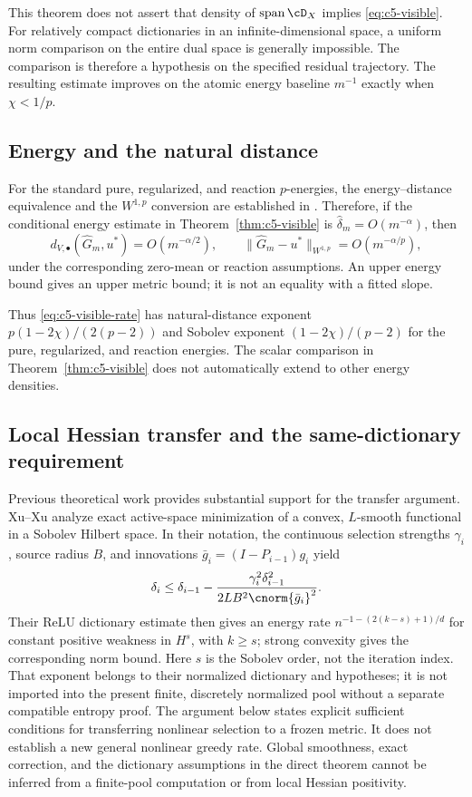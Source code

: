 \documentclass[11pt]{article}
\theoremstyle{remark}
\begin{document}
This theorem does not assert that density of $\operatorname{span}\cD_X$
implies \eqref{eq:c5-visible}. For relatively compact dictionaries in an
infinite-dimensional space, a uniform norm comparison on the entire dual
space is generally impossible. The comparison is therefore a hypothesis on
the specified residual trajectory. The resulting estimate improves on the
atomic energy baseline $m^{-1}$ exactly when $\chi<1/p$.

\subsection{Energy and the natural distance}
\label{sec:c5-natural}

For the standard pure, regularized, and reaction $p$-energies, the energy--distance
equivalence and the $W^{1,p}$ conversion are established in
\CGAEnergyMetricReference. Therefore, if the
conditional energy estimate in Theorem~\ref{thm:c5-visible} is
$\widehat\delta_m=O(m^{-\alpha})$, then
\[
 d_{V,\bullet}(\widehat G_m,u^*)=O(m^{-\alpha/2}),\qquad
 \|\widehat G_m-u^*\|_{W^{1,p}}=O(m^{-\alpha/p}),
\]
under the corresponding zero-mean or reaction assumptions. An upper energy bound
gives an upper metric bound; it is not an equality with a fitted slope.

Thus \eqref{eq:c5-visible-rate} has natural-distance exponent
$p(1-2\chi)/(2(p-2))$ and Sobolev exponent $(1-2\chi)/(p-2)$ for the
pure, regularized, and reaction energies. The scalar comparison in Theorem~\ref{thm:c5-visible}
does not automatically extend to other energy densities.

\subsection{Local Hessian transfer and the same-dictionary requirement}
\label{sec:c5-hessian}

Previous theoretical work provides substantial support for the transfer argument.
Xu--Xu \cite[Theorem~3.1, equations~(17)--(19)]{XuXu2025}
analyze exact active-space minimization of a convex, $L$-smooth
functional in a Sobolev Hilbert space. In their notation, the continuous
selection strengths $\gamma_i$, source radius $B$, and innovations
$\bar g_i=(I-P_{i-1})g_i$ yield
\[
 \delta_i\leq\delta_{i-1}
 -\frac{\gamma_i^2\delta_{i-1}^2}{2LB^2\cnorm{\bar g_i}^2}.
\]
Their ReLU dictionary estimate then gives an energy rate
$n^{-1-(2(k-s)+1)/d}$ for constant positive weakness in $H^s$,
with $k\geq s$; strong convexity gives the corresponding norm bound.
Here $s$ is the Sobolev order, not the iteration index.
That exponent belongs to their normalized dictionary and hypotheses; it is
not imported into the present finite, discretely normalized pool without a
separate compatible entropy proof.
The argument below states explicit sufficient conditions for
transferring nonlinear selection to a frozen metric. It does not establish
a new general nonlinear greedy rate. Global smoothness, exact correction,
and the dictionary assumptions in the direct theorem cannot be inferred
from a finite-pool computation or from local Hessian positivity.
\end{document}
